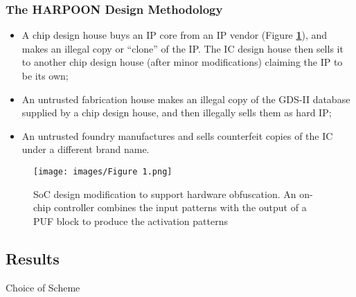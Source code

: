 \documentclass{optica-article}
\begin{document}
\subsubsection{The HARPOON Design Methodology}

\begin{itemize}
    \item A chip design house buys an IP core from an IP vendor (Figure \textbf{\ref{fig:Figure 1}}), and makes an illegal copy or “clone” of the IP. The IC design house then sells it to another chip design house (after minor modifications) claiming the IP to be its own;
    \item An untrusted fabrication house makes an illegal copy of the GDS-II database supplied by a chip design house, and then illegally sells them as hard IP;
    \item An untrusted foundry manufactures and sells counterfeit copies of the IC under a different brand name.
\end{itemize}

\begin{figure}[H]
    \centering
    \texttt{[image: images/Figure 1.png]}
    \caption{SoC design modification to support hardware obfuscation. An on-chip controller combines the input patterns with the output of a PUF block to produce the activation patterns}
    \label{fig:Figure 1}
\end{figure}



\subsection{Results}

Choice of Scheme \\
\end{document}

